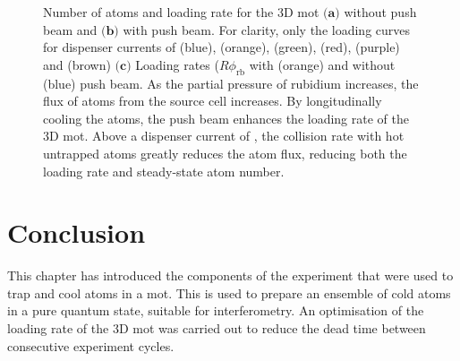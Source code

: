 \begin{figure}[!htbp]
	\caption[3D \ac{mot} atom number vs dispenser current with and without a
		push beam.]{Number of atoms and loading rate for the 3D \ac{mot}
      $\textbf{(a)}$ without push beam and $\textbf{(b)}$ with push beam. For clarity, only the loading curves for dispenser
		currents of
		 (blue),
		(orange),  (green),  (red),
		 (purple) and  (brown)
    $\textbf{(c)}$ Loading rates (\(R
    \phi_\text{rb}\) with (orange) and without (blue) push beam. 
		As the partial pressure of rubidium increases, the
		flux of atoms from the source cell increases. By longitudinally cooling
		the atoms, the push beam enhances the loading rate of the 3D \ac{mot}.
		Above a dispenser current of
		, the collision rate with hot untrapped atoms greatly reduces the atom flux, reducing both the loading rate and steady-state atom number.}
	\label{fig:loading_plots}
\end{figure}

\section{Conclusion}
This chapter has introduced the components of the experiment that were used to
trap and cool atoms in a \ac{mot}. This is used to prepare an ensemble of cold
atoms in a pure quantum state, suitable for interferometry. An optimisation of
the loading rate of the 3D \ac{mot} was carried out to reduce the dead time
between consecutive experiment cycles. 
